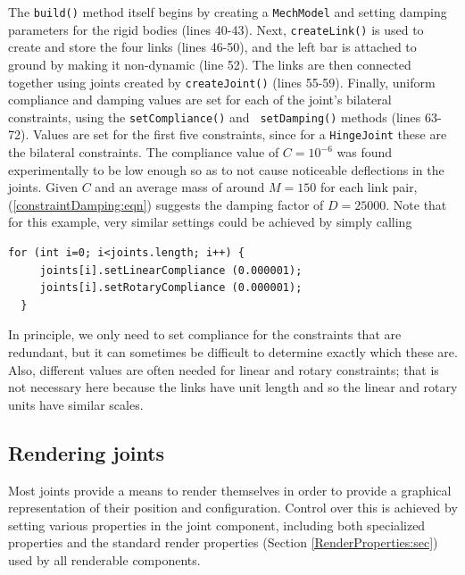 The {\tt build()} method itself begins by creating a {\tt MechModel}
and setting damping parameters for the rigid bodies (lines
40-43). Next, {\tt createLink()} is used to create and store the four
links (lines 46-50), and the left bar is attached to ground by making
it non-dynamic (line 52). The links are then connected together using
joints created by {\tt createJoint()} (lines 55-59). Finally, uniform
compliance and damping values are set for each of the joint's
bilateral constraints, using the {\tt setCompliance()} and {\tt
setDamping()} methods (lines 63-72). Values are set for the first five
constraints, since for a {\tt HingeJoint} these are the bilateral
constraints. The compliance value of $C = 10^{-6}$ was found
experimentally to be low enough so as to not cause noticeable
deflections in the joints. Given $C$ and an
average mass of around $M = 150$ for each link pair,
(\ref{constraintDamping:eqn}) suggests the damping factor of $D =
25000$. Note that for this example, very similar settings could be
achieved by simply calling
%
\begin{lstlisting}[]
  for (int i=0; i<joints.length; i++) {
     joints[i].setLinearCompliance (0.000001);
     joints[i].setRotaryCompliance (0.000001);
  }
\end{lstlisting}
%
In principle, we only need to set compliance for the constraints that
are redundant, but it can sometimes be difficult to determine exactly
which these are. Also, different values are often needed for linear
and rotary constraints; that is not necessary here because the
links have unit length and so the linear and rotary units have similar
scales.

\subsection{Rendering joints}
\label{RenderingJoints:sec}

Most joints provide a means to render themselves in order to provide a
graphical representation of their position and configuration.  Control
over this is achieved by setting various properties in the joint
component, including both specialized properties and the standard
render properties (Section \ref{RenderProperties:sec}) used by all
renderable components.

